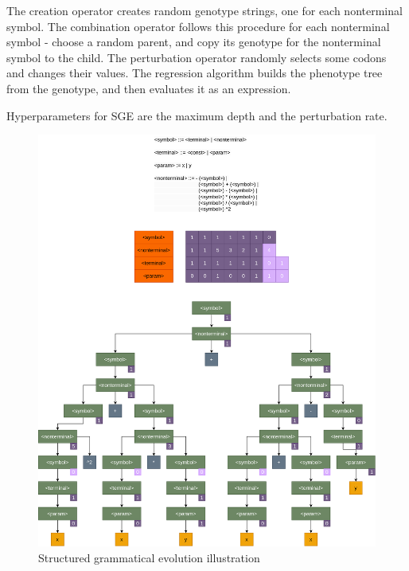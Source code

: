 The creation operator creates random genotype strings, one for each nonterminal symbol. The combination operator follows this procedure for each nonterminal symbol - choose a random parent, and copy its genotype for the nonterminal symbol to the child. The perturbation operator randomly selects some codons and changes their values. The regression algorithm builds the phenotype tree from the genotype, and then evaluates it as an expression.

Hyperparameters for SGE are the maximum depth and the perturbation rate.

\begin{figure}[!htbp]
	\centering
	\includegraphics[scale=0.19]{../images/sge.png}
	\caption{Structured grammatical evolution illustration}
    \label{fig:sge}
\end{figure}